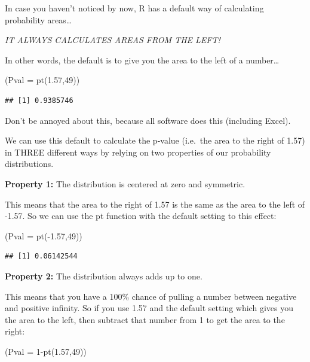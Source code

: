 \documentclass[
]{book}
\newenvironment{Shaded}{\begin{snugshade}}{\end{snugshade}}
\newcommand{\AttributeTok}[1]{\textcolor[rgb]{0.77,0.63,0.00}{#1}}
\newcommand{\DecValTok}[1]{\textcolor[rgb]{0.00,0.00,0.81}{#1}}
\newcommand{\FloatTok}[1]{\textcolor[rgb]{0.00,0.00,0.81}{#1}}
\newcommand{\FunctionTok}[1]{\textcolor[rgb]{0.00,0.00,0.00}{#1}}
\newcommand{\NormalTok}[1]{#1}
\newcommand{\SpecialCharTok}[1]{\textcolor[rgb]{0.00,0.00,0.00}{#1}}
\begin{document}
In case you haven't noticed by now, R has a default way of calculating probability areas\ldots{}

\emph{IT ALWAYS CALCULATES AREAS FROM THE LEFT!}

In other words, the default is to give you the area to the left of a number\ldots{}

\begin{Shaded}
\begin{Highlighting}[]
\NormalTok{(}\AttributeTok{Pval =} \FunctionTok{pt}\NormalTok{(}\FloatTok{1.57}\NormalTok{,}\DecValTok{49}\NormalTok{))}
\end{Highlighting}
\end{Shaded}

\begin{verbatim}
## [1] 0.9385746
\end{verbatim}

Don't be annoyed about this, because all software does this (including Excel).

We can use this default to calculate the p-value (i.e.~the area to the right of 1.57) in THREE different ways by relying on two properties of our probability distributions.

\textbf{Property 1:} The distribution is centered at zero and symmetric.

This means that the area to the right of 1.57 is the same as the area to the left of -1.57. So we can use the pt function with the default setting to this effect:

\begin{Shaded}
\begin{Highlighting}[]
\NormalTok{(}\AttributeTok{Pval =} \FunctionTok{pt}\NormalTok{(}\SpecialCharTok{{-}}\FloatTok{1.57}\NormalTok{,}\DecValTok{49}\NormalTok{))}
\end{Highlighting}
\end{Shaded}

\begin{verbatim}
## [1] 0.06142544
\end{verbatim}

\textbf{Property 2:} The distribution always adds up to one.

This means that you have a 100\% chance of pulling a number between negative and positive infinity. So if you use 1.57 and the default setting which gives you the area to the left, then subtract that number from 1 to get the area to the right:

\begin{Shaded}
\begin{Highlighting}[]
\NormalTok{(}\AttributeTok{Pval =} \DecValTok{1}\SpecialCharTok{{-}}\FunctionTok{pt}\NormalTok{(}\FloatTok{1.57}\NormalTok{,}\DecValTok{49}\NormalTok{))}
\end{Highlighting}
\end{Shaded}
\end{document}
